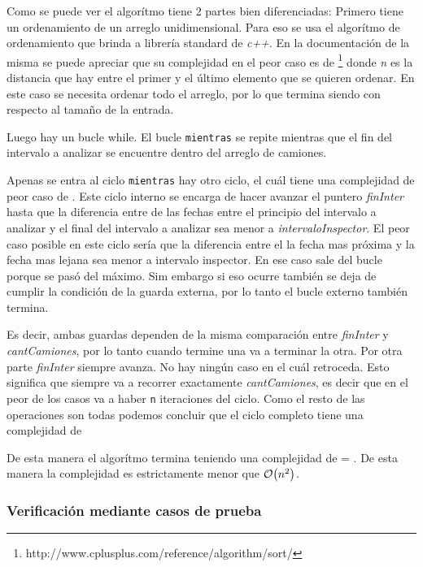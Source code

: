 \documentclass[11pt, a4paper, twoside]{article}
\begin{document}
Como se puede ver el algorítmo tiene 2 partes bien diferenciadas: Primero tiene
un ordenamiento de un arreglo unidimensional. Para eso se usa el algorítmo de
ordenamiento que brinda a librería standard de \textit{c++}. En la documentación
de la misma se puede apreciar que su complejidad en el peor caso es de \footnote{http://www.cplusplus.com/reference/algorithm/sort/} donde
\textit{n} es la distancia que hay entre el primer y el último elemento que se
quieren ordenar. En este caso se necesita ordenar todo el arreglo, por lo que
termina siendo  con respecto al tamaño de la entrada.

Luego hay un bucle while. El bucle \texttt{mientras} se repite mientras que el
fin del intervalo a analizar se encuentre dentro del arreglo de camiones.

Apenas se entra al ciclo \texttt{mientras} hay otro ciclo, el cuál tiene una
complejidad de peor caso de . Este ciclo interno se encarga de hacer
avanzar el puntero \textit{finInter} hasta que la diferencia entre de las fechas
entre el principio del intervalo a analizar y el final del intervalo a analizar
sea menor a \textit{intervaloInspector}. El peor caso posible en este ciclo
sería que la diferencia entre el la fecha mas próxima y la fecha mas lejana sea
menor a intervalo inspector. En ese caso sale del bucle porque se pasó del
máximo. Sim embargo si eso ocurre también se deja de cumplir la condición de la
guarda externa, por lo tanto el bucle externo también termina.


Es decir, ambas guardas dependen de la misma comparación entre \textit{finInter}
y \textit{cantCamiones}, por lo tanto cuando termine una va a terminar la otra.
Por otra parte \textit{finInter} siempre avanza. No hay ningún caso en el cuál
retroceda. Esto significa que siempre va a recorrer exactamente
\textit{cantCamiones}, es decir que en el peor de los casos va a haber
\texttt{n} iteraciones del ciclo. Como el resto de las operaciones son todas
 podemos concluir que el ciclo completo tiene una complejidad de


De esta manera el algorítmo termina teniendo una complejidad de  = . De esta manera la complejidad es estrictamente menor que
$\mathop{}\mathopen{}\mathcal{O}\mathopen{}\left(n^{2}\right)$.








\subsubsection{Verificación mediante casos de prueba}
\end{document}

